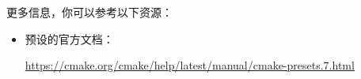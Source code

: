 更多信息，你可以参考以下资源：

\begin{itemize}
\item
预设的官方文档：

\url{https://cmake.org/cmake/help/latest/manual/cmake-presets.7.html}
\end{itemize}
